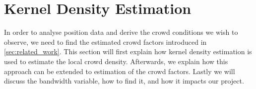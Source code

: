 \section{Kernel Density Estimation}
\label{sec:kernelDensityEstimation}
In order to analyse position data and derive the crowd conditions we wish to observe, we need to find the estimated crowd factors introduced in \cref{sec:related_work}. This section will first explain how kernel density estimation is used to estimate the local crowd density. Afterwards, we explain how this approach can be extended to estimation of the crowd factors. Lastly we will discuss the bandwidth variable, how to find it, and how it impacts our project.





